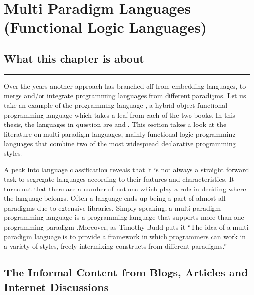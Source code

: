 \documentclass[thesis-solanki.tex]{subfiles}
\begin{document}
\chapter{Multi Paradigm Languages (Functional Logic Languages)}\label{chap:multiparadigm}


\section{What this chapter is about}

\noindent\rule{\textwidth}{0.5pt}


Over the years another approach has branched off from embedding languages, to merge and/or integrate programming
languages from different paradigms.
Let us take an example of the  programming language \cite{website:scala}, a hybrid
object-functional programming language which takes a leaf from each of the two books.
In this thesis, the languages in question are  and .
This section takes a look at the literature on multi paradigm languages, mainly functional logic programming
languages that combine two of the most widespread declarative programming styles.

A peak into language classification reveals that it is not always a straight forward task to segregate languages
according to their features and characteristics.
It turns out that there are a number of notions which play a role in deciding where the language belongs.
Often a language ends up being a part of almost all paradigms due to extensive libraries.
Simply speaking, a multi paradigm programming language is a programming language that supports more than one
programming paradigm \cite{Krishnamurthi:2008:TPL:1480828.1480846}.Moreover, as Timothy Budd puts it
\cite{website:wikimultiparadigm} ``The idea of a multi paradigm language is to provide a framework in which
programmers can work in a variety of styles, freely intermixing constructs from different paradigms.''


\section{The Informal Content from Blogs, Articles and Internet Discussions}
  
\end{document}
